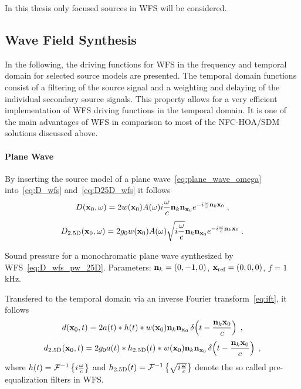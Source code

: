 In this thesis only focused sources in \ac{WFS} will be considered.


\subsection{Wave Field Synthesis}
\label{sec:driving_functions_wfs}

In the following, the driving functions for \ac{WFS} in the frequency and
temporal domain
for selected source models are presented. The temporal domain
functions consist of a filtering of the source signal and a weighting and
delaying of the individual secondary source signals. This property allows for a very efficient
implementation of \ac{WFS} driving functions in the temporal domain.
It is one of the main advantages of \ac{WFS} in comparison
to most of the \ac{NFC-HOA}/\ac{SDM} solutions discussed above.

\paragraph{Plane Wave}
%
%
By inserting the source model of a plane wave~\eqref{eq:plane_wave_omega}
into~\eqref{eq:D_wfs} and~\eqref{eq:D25D_wfs} it follows
%
\begin{equation}
    D(\x_0,\omega) = 2 w(\x_0) A(\omega) i\omegac \n_k\n_{\x_0}
    e^{-i\omegac\n_k\x_0} \qc
    \label{eq:D_wfs_pw}
\end{equation}
%
\begin{equation}
    D_\twohalfD(\x_0,\omega) = 2g_0 w(\x_0) A(\omega) \sqrt{i\omegac} \n_k\n_{\x_0} 
    e^{-i\omegac\n_k\x_0} \qp
    \label{eq:D_wfs_pw_25D}
\end{equation}
%
\begin{marginfigure}[-0.5cm]
    \centering
    \ft
    
    \caption{Sound pressure for a monochromatic plane wave synthesized by
        \twohalfD \ac{WFS}~\eqref{eq:D_wfs_pw_25D}. Parameters: $\mathbf{n}_k = (0,-1,0)$, $\mathbf{x}_\text{ref}
        = (0,0,0)$, $f = 1$\,kHz.
        }
\end{marginfigure}
%
Transfered to the temporal domain via an inverse Fourier
transform~\eqref{eq:ift}, it follows
%
\begin{equation}
    d(\x_0,t) = 2 a(t) * h(t) * w(\x_0) \n_k \n_{\x_0} \deltafunc{t -
    \frac{\n_k\x_0}{c}} \qc
    \label{eq:d_wfs_pw}
\end{equation}
%
\begin{equation}
    d_\twohalfD(\x_0,t) = 2g_0 a(t) * h_\twohalfD(t) * w(\x_0) \n_k \n_{\x_0}
    \deltafunc{t - \frac{\n_k\x_0}{c}} \qc
    \label{eq:d_wfs_pw_25D}
\end{equation}
%
where $h(t) =  \mathcal{F}^{-1}\left\{i\frac{\omega}{c}\right\}$ and $h_{2.5\text{D}}(t) =  \mathcal{F}^{-1}\left\{\sqrt{i\frac{\omega}{c}}\right\}$
denote the so called pre-equalization filters in \ac{WFS}.

